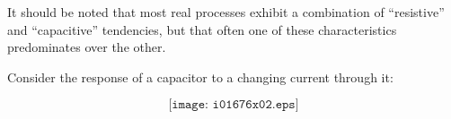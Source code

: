 It should be noted that most real processes exhibit a combination of ``resistive'' and ``capacitive'' tendencies, but that often one of these characteristics predominates over the other.

Consider the response of a capacitor to a changing current through it:

$$\texttt{[image: i01676x02.eps]}$$












